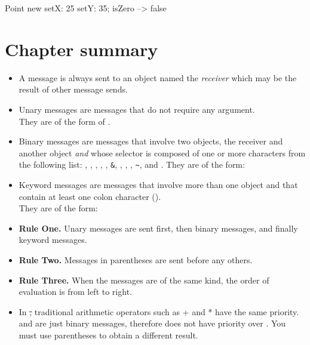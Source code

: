 \documentclass[a4paper,10pt,twoside]{book}
\begin{document}
\begin{code}{}
Point new setX: 25 setY: 35; isZero --> false
\end{code}

\section{Chapter summary}

\begin{itemize}
\item A message is always sent to an object named the \emph{receiver} which may be the result of other message sends.

\item Unary messages are messages that do not require any argument.\\
They are of the form of .

\item Binary messages are messages that involve two objects, the receiver and another object \emph{and} whose selector is composed of  one or more characters from the following list: \ct{+}, \ct{-}, \ct{*}, \ct{/}, \ct{|}, \texttt{\&}, \ct{=}, \ct{>}, \ct{<}, \texttt{\~}, and .
They are of the form: 
\item Keyword messages are messages that involve more than one object and that contain at least one colon character (\ct{:}). \\
They are of the form:

\item \textbf{Rule One.} Unary messages are sent first, then binary messages, and finally keyword messages.
\item \textbf{Rule Two.} Messages in parentheses are sent before any others.
\item \textbf{Rule Three.} When the messages are of the same kind, the order of evaluation is from left to right.
\item In \st, traditional arithmetic operators such as + and * have the same priority. \ct{+} and \ct{*} are just binary messages, therefore \ct{*} does not have priority over \ct{+}. You must use parentheses to obtain a different result.
\end{itemize}

\ifx\wholebook\relax\else
\end{document}
